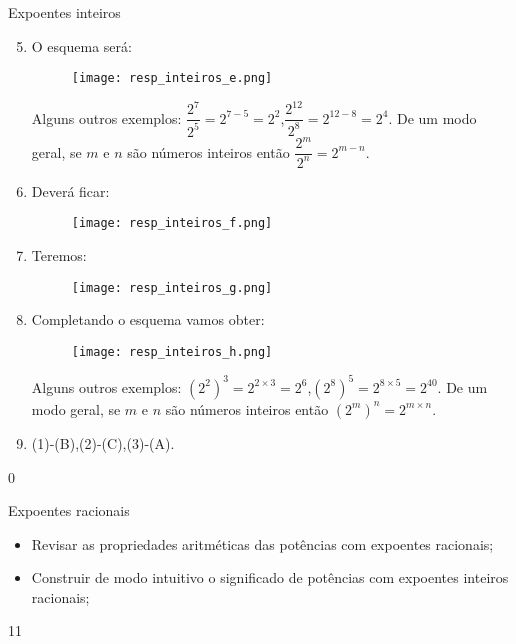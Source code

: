\begin{answer}{Expoentes inteiros}
{
\begin{enumerate}\setcounter{enumi}{4}
\item
O esquema será:

\begin{figure}[H]
\centering
\noindent\texttt{[image: resp\_inteiros\_e.png]}
\end{figure}

Alguns outros exemplos: $\dfrac{2^7}{2^5} =2^{7-5}=2^2$,\quad $\dfrac{2^{12}}{2^8} =2^{12-8}=2^4$. De um modo geral, se $m$ e $n$ são números inteiros então $\dfrac{2^m}{2^n} =2^{m-n}$.

\item Deverá ficar:

\begin{figure}[H]
\centering
\noindent\texttt{[image: resp\_inteiros\_f.png]}
\end{figure}

\item Teremos:

\begin{figure}[H]
\centering
\noindent\texttt{[image: resp\_inteiros\_g.png]}
\end{figure}

\item Completando o esquema vamos obter:

\begin{figure}[H]
\centering
\noindent\texttt{[image: resp\_inteiros\_h.png]}
\end{figure}

Alguns outros exemplos: $(2^{2})^{3}=2^{2\times3}=2^6$,\quad $(2^{8})^{5}=2^{8\times5}=2^{40}$. De um modo geral, se $m$ e $n$ são números inteiros então $(2^{m})^{n}=2^{m \times n}$.

\item (1)-(B),\quad (2)-(C),\quad (3)-(A).
\end{enumerate}
}{0}
\end{answer}
\clearmargin
\marginpar{\vspace{-1.5em}}
\begin{objectives}{Expoentes racionais}
{
\begin{itemize}
\item Revisar as propriedades aritméticas das potências com expoentes racionais;
\item Construir de modo intuitivo o significado de potências com expoentes inteiros racionais;

\end{itemize}
}{1}{1}
\end{objectives}
